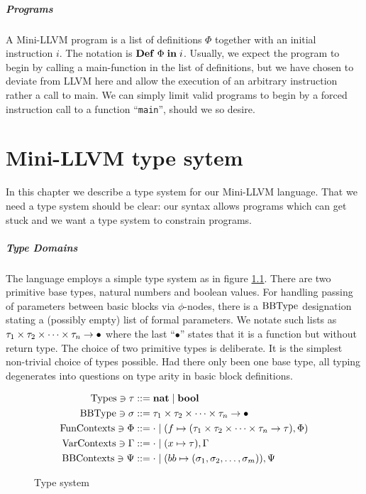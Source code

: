 \documentclass[a4paper, oneside, 10pt, draft]{memoir}
\begin{document}
\paragraph{Programs}

A Mini-LLVM program is a list of definitions $\Phi$ together with an
initial instruction $i$. The notation is $\mathbf{Def} \; \Phi \; \mathbf{in} \; i$. Usually, we
expect the program to begin by calling a main-function in the list of
definitions, but we have chosen to deviate from LLVM here and allow
the execution of an arbitrary instruction rather a call to main. We
can simply limit valid programs to begin by a forced instruction
call to a function ``\texttt{main}'', should we so desire.

\chapter{Mini-LLVM type sytem}
\label{chap:type-system}

In this chapter we describe a type system for our Mini-LLVM
language. That we need a type system should be clear: our syntax
allows programs which can get stuck and we want a type system to
constrain programs.

\paragraph{Type Domains} The language employs a simple type system as in
figure \ref{fig:type-system}. There are two primitive base types,
natural numbers and boolean values. For handling passing of parameters
between basic blocks via $\phi$-nodes, there is a $\mathrm{BB Type}$
designation stating a (possibly empty) list of formal parameters. We
notate such lists as $\tau_1 \times \tau_2 \times \dotsb \times \tau_n -> \bullet$ where the last
``$\bullet$'' states that it is a function but without return type.
The choice of two primitive types is deliberate. It is the simplest
non-trivial choice of types possible. Had there only been one base
type, all typing degenerates into questions on type arity in basic
block definitions.

\begin{figure}
  \begin{align*}
    \mathrm{Types} \ni \tau & ::= \mathbf{nat} \; \vert \; \mathbf{bool} \\
    \mathrm{BB Type} \ni \sigma   & ::= \tau_1 \times \tau_2 \times \dotsb \times \tau_n -> \bullet\\
    \mathrm{Fun Contexts} \ni \Phi & ::= \cdot \; \vert \; (f \mapsto (\tau_1 \times \tau_2 \times \dotsb \times \tau_n -> \tau), \Phi) \\
    \mathrm{Var Contexts} \ni \Gamma & ::= \cdot \; \vert \; (x \mapsto \tau),\Gamma\\
    \mathrm{BB Contexts} \ni \Psi   & ::= \cdot \; \vert \; (bb \mapsto (\sigma_1, \sigma_2, \dotsc, \sigma_m)),\Psi
  \end{align*}
  \caption{Type system}
  \label{fig:type-system}
\end{figure}
\end{document}
